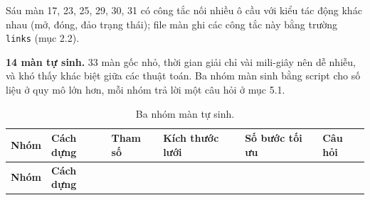 Sáu màn 17, 23, 25, 29, 30, 31 có công tắc nối nhiều ô cầu với kiểu tác động khác nhau (mở, đóng, đảo trạng thái); file màn ghi các công tắc này bằng trường \texttt{links} (mục 2.2).

\textbf{14 màn tự sinh.} 33 màn gốc nhỏ, thời gian giải chỉ vài mili-giây nên dễ nhiễu, và khó thấy khác biệt giữa các thuật toán. Ba nhóm màn sinh bằng script cho số liệu ở quy mô lớn hơn, mỗi nhóm trả lời một câu hỏi ở mục 5.1.


\begin{longtable}[]{@{}
  >{\raggedright\arraybackslash}p{}
  >{\raggedright\arraybackslash}p{}
  >{\raggedright\arraybackslash}p{}
  >{\raggedright\arraybackslash}p{}
  >{\raggedright\arraybackslash}p{}
  >{\raggedright\arraybackslash}p{}@{}}
\caption{ Ba nhóm màn tự sinh.}\tabularnewline
\toprule\noalign{}
\rowcolor{tablehead}\begin{minipage}[b]{\linewidth}\raggedright
\textbf{Nhóm}
\end{minipage} & \begin{minipage}[b]{\linewidth}\raggedright
\textbf{Cách dựng}
\end{minipage} & \begin{minipage}[b]{\linewidth}\raggedright
\textbf{Tham số}
\end{minipage} & \begin{minipage}[b]{\linewidth}\raggedright
\textbf{Kích thước lưới}
\end{minipage} & \begin{minipage}[b]{\linewidth}\raggedright
\textbf{Số bước tối ưu}
\end{minipage} & \begin{minipage}[b]{\linewidth}\raggedright
\textbf{Câu hỏi}
\end{minipage} \\
\midrule\noalign{}
\endfirsthead
\toprule\noalign{}
\rowcolor{tablehead}\begin{minipage}[b]{\linewidth}\raggedright
\textbf{Nhóm}
\end{minipage} & \begin{minipage}[b]{\linewidth}\raggedright
\textbf{Cách dựng}
\end{minipage} & \begin{minipage}[b]{\linewidth}\raggedright

\end{minipage}
\end{longtable}
